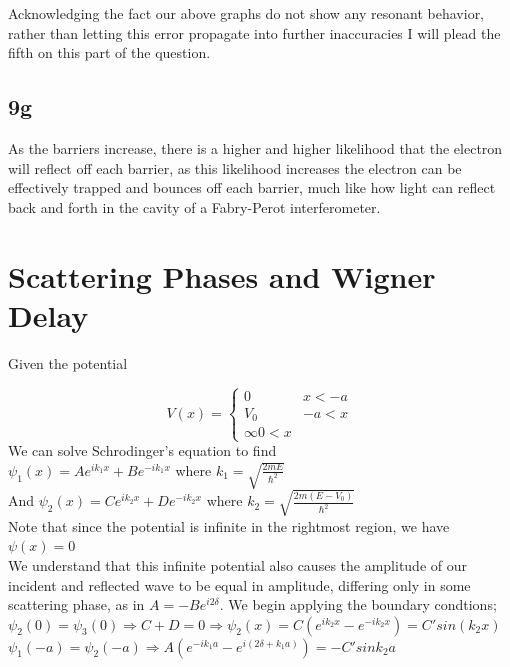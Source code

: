 \documentclass{article}
\begin{document}
Acknowledging the fact our above graphs do not show any resonant behavior, rather than letting this error propagate into further inaccuracies I will plead the fifth on this part of the question.

\subsection*{9g}

As the barriers increase, there is a higher and higher likelihood that the electron will reflect off each barrier, as this likelihood increases the electron can be effectively trapped and bounces off each barrier, much like how light can reflect back and forth in the cavity of a Fabry-Perot interferometer. \\

\section*{Scattering Phases and Wigner Delay}

Given the potential

\[
  V(x) =
  \begin{cases}
    0  & x<-a \\
    V_0 & -a<x\\
    \infty 0<x
  \end{cases}
\]
We can solve Schrodinger's equation to find \\

$\psi_1(x)=Ae^{ik_1x}+Be^{-ik_1x}$ where $k_1=\sqrt{\frac{2mE}{\hbar^2}}$\\

And $\psi_2(x)=Ce^{ik_2x}+De^{-ik_2x}$ where $k_2=\sqrt{\frac{2m(E-V_0)}{\hbar^2}}$\\

Note that since the potential is infinite in the rightmost region, we have $\psi(x)=0$\\

We understand that this infinite potential also causes the amplitude of our incident and reflected wave to be equal in amplitude, differing only in some scattering phase, as in $A=-Be^{i2\delta}$. We begin applying the boundary condtions;\\

$\psi_2(0)=\psi_3(0)\Rightarrow C+D=0\Rightarrow \psi_2(x)=C(e^{ik_2x}-e^{-ik_2x})=C'sin(k_2x)$\\

$\psi_1(-a)=\psi_2(-a)\Rightarrow A(e^{-ik_1a}-e^{i(2\delta+k_1a)})=-C'sink_2a$\\
\end{document}
